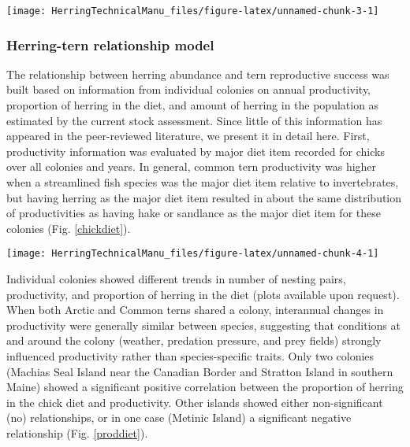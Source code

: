 \documentclass[]{article}
\let\origfigure\figure
\let\endorigfigure\endfigure
\renewenvironment{figure}[1][2] {
    \expandafter\origfigure\expandafter[H]
} {
    \endorigfigure
}
\begin{document}
\begin{figure}

{\centering \texttt{[image: HerringTechnicalManu\_files/figure-latex/unnamed-chunk-3-1]} 

}

\caption{Population trends for Gulf of Maine terns, no herring link \label{terntrend}}\label{fig:unnamed-chunk-3}
\end{figure}

\subsubsection{Herring-tern relationship
model}\label{herring-tern-relationship-model}

The relationship between herring abundance and tern reproductive success
was built based on information from individual colonies on annual
productivity, proportion of herring in the diet, and amount of herring
in the population as estimated by the current stock assessment. Since
little of this information has appeared in the peer-reviewed literature,
we present it in detail here. First, productivity information was
evaluated by major diet item recorded for chicks over all colonies and
years. In general, common tern productivity was higher when a
streamlined fish species was the major diet item relative to
invertebrates, but having herring as the major diet item resulted in
about the same distribution of productivities as having hake or
sandlance as the major diet item for these colonies (Fig.
\ref{chickdiet}).

\begin{figure}

{\centering \texttt{[image: HerringTechnicalManu\_files/figure-latex/unnamed-chunk-4-1]} 

}

\caption{Major diet items for Gulf of Maine tern fledgelings \label{chickdiet}}\label{fig:unnamed-chunk-4}
\end{figure}

Individual colonies showed different trends in number of nesting pairs,
productivity, and proportion of herring in the diet (plots available
upon request). When both Arctic and Common terns shared a colony,
interannual changes in productivity were generally similar between
species, suggesting that conditions at and around the colony (weather,
predation pressure, and prey fields) strongly influenced productivity
rather than species-specific traits. Only two colonies (Machias Seal
Island near the Canadian Border and Stratton Island in southern Maine)
showed a significant positive correlation between the proportion of
herring in the chick diet and productivity. Other islands showed either
non-significant (no) relationships, or in one case (Metinic Island) a
significant negative relationship (Fig. \ref{proddiet}).
\end{document}
